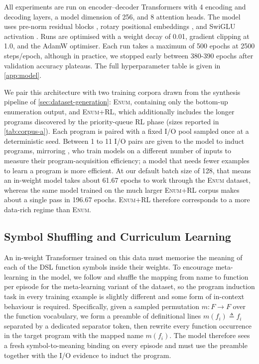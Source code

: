 \documentclass[12pt]{article}
\begin{document}
All experiments are run on encoder--decoder Transformers with 4 encoding and decoding layers, a model dimension of 256, and 8 attention heads. The model uses pre-norm residual blocks \citep{nguyen2019transformers}, rotary positional embeddings \citep{su2024roformer}, and SwiGLU activation \citep{shazeer2020glu}. Runs are optimised with a weight decay of 0.01, gradient clipping at 1.0, and the AdamW optimiser. Each run takes a maximum of 500 epochs at 2500 steps/epoch, although in practice, we stopped early between 380-390 epochs after validation accuracy plateaus. The full hyperparameter table is given in \cref{app:model}.

We pair this architecture with two training corpora drawn from the synthesis pipeline of \cref{sec:dataset-generation}: \textsc{Enum}, containing only the bottom-up enumeration output, and \textsc{Enum+RL}, which additionally includes the longer programs discovered by the priority-queue RL phase (sizes reported in \cref{tab:corpus-a}). Each program is paired with a fixed I/O pool sampled once at a deterministic seed. Between 1 to 11 I/O pairs are given to the model to induct programs, mirroring \citet{rule2024symbolic}, who train models on a different number of inputs to measure their program-acquisition efficiency; a model that needs fewer examples to learn a program is more efficient. At our default batch size of 128, that means an in-weight model takes about 61.67 epochs to work through the \textsc{Enum} dataset, whereas the same model trained on the much larger \textsc{Enum+RL} corpus makes about a single pass in 196.67 epochs. \textsc{Enum+RL} therefore corresponds to a more data-rich regime than \textsc{Enum}.

\subsection{Symbol Shuffling and Curriculum Learning}
\label{sec:symbol-shuffling}

An in-weight Transformer trained on this data must memorise the meaning of each of the DSL function symbols inside their weights. To encourage meta-learning in the model, we follow \citet{lake2023human} and shuffle the mapping from name to function per episode for the meta-learning variant of the dataset, so the program induction task in every training example is slightly different and some form of in-context behaviour is required. Specifically, given a sampled permutation $m: F \to F$ over the function vocabulary, we form a preamble of definitional lines $m(f_i) \triangleq f_i$ separated by a dedicated separator token, then rewrite every function occurrence in the target program with the mapped name $m(f_i)$. The model therefore sees a fresh symbol-to-meaning binding on every episode and must use the preamble together with the I/O evidence to induct the program.
\end{document}
